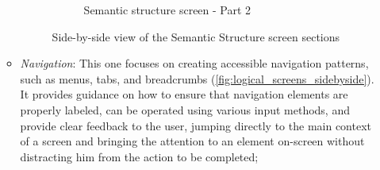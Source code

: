 \begin{enumerate}
\begin{itemize}
\begin{figure}[ht]
\begin{subfigure}[b]{0.48\textwidth}
                \caption{Semantic structure screen - Part 2}
                \label{fig:semantics-right}
            \end{subfigure}
            \caption{Side-by-side view of the Semantic Structure screen sections}
            \label{fig:semantics_screens_sidebyside}
        \end{figure}

        \FloatBarrier

        \item \textit{Navigation}: This one focuses on creating accessible navigation patterns, such as menus, tabs, and breadcrumbs (\ref{fig:logical_screens_sidebyside}). It provides guidance on how to ensure that navigation elements are properly labeled, can be operated using various input methods, and provide clear feedback to the user, jumping directly to the main context of a screen and bringing the attention to an element on-screen without distracting him from the action to be completed;


\end{itemize}
\end{enumerate}
